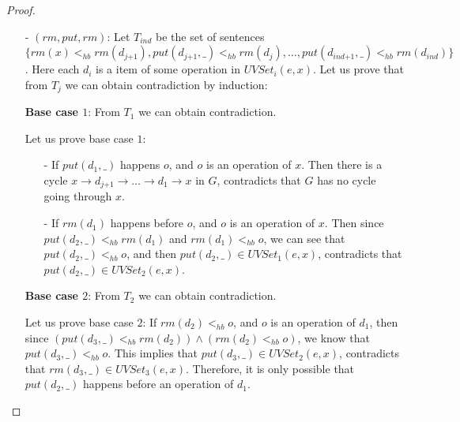 \begin {proof}
\begin{itemize}
\begin{itemize}
    \item[-] If $( j > 1 ) \wedge ( \textit{rm}(d_j) <_{hb} o'' )$, where $o''$ is an operation of item $d_{\textit{j-1}}$ and $\textit{put}(d_{\textit{j-1}},\_), \textit{rm}(d_{\textit{j-1}}) \in \textit{UVSet}_{\textit{j-1}}(e,x)$: Then since $( \textit{put}(d_{\textit{j+1}},\_) <_{hb} \textit{put}(d_j,\_) ) \wedge ( \textit{rm}(d_j) <_{hb} o'' )$, we can see that $( \textit{put}(d_{\textit{j+1}},\_) <_{hb} o'' ) \vee ( \textit{rm}(d_j) <_{hb} \textit{put}(d_j,\_) )$, which is impossible.

    \item[-] If $( j > 1 ) \wedge ( \textit{rm}(d_j) <_{hb} o'' )$, where $o''$ is an operation of $x$: Similar to above case.
    \end{itemize}

\item[-] $(\textit{rm},\textit{put},\textit{rm})$: Let $T_{\textit{ind}}$ be the set of sentences $\{ \textit{rm}(x) <_{hb} \textit{rm}(d_{\textit{j+1}}), \textit{put}(d_{\textit{j+1}},\_) <_{hb} \textit{rm}(d_j),\ldots, \textit{put}(d_{\textit{ind+1}},\_) <_{hb} \textit{rm}(d_{\textit{ind}}) \}$. Here each $d_i$ is a item of some operation in $\textit{UVSet}_i(e,x)$. Let us prove that from $T_j$ we can obtain contradiction by induction:

    {\bf Base case $1$}: From $T_1$ we can obtain contradiction.

    Let us prove base case $1$:

    \begin{itemize}
    \setlength{\itemsep}{0.5pt}
    \item[-] If $\textit{put}(d_1,\_)$ happens $o$, and $o$ is an operation of $x$. Then there is a cycle $x \rightarrow d_{\textit{j+1}} \rightarrow \ldots \rightarrow d_1 \rightarrow x$ in $G$, contradicts that $G$ has no cycle going through $x$.

    \item[-] If $\textit{rm}(d_1)$ happens before $o$, and $o$ is an operation of $x$. Then since $\textit{put}(d_2,\_) <_{hb} \textit{rm}(d_1)$ and $\textit{rm}(d_1) <_{hb} o$, we can see that $\textit{put}(d_2,\_) <_{hb} o$, and then $\textit{put}(d_2,\_) \in \textit{UVSet}_1(e,x)$, contradicts that $\textit{put}(d_2,\_) \in \textit{UVSet}_2(e,x)$.
    \end{itemize}

    {\bf Base case $2$}: From $T_2$ we can obtain contradiction.

    Let us prove base case $2$: If $\textit{rm}(d_2) <_{hb} o$, and $o$ is an operation of $d_1$, then since $( \textit{put}(d_3,\_) <_{hb} \textit{rm}(d_2) ) \wedge ( \textit{rm}(d_2) <_{hb} o )$, we know that $\textit{put}(d_3,\_) <_{hb} o$. This implies that $\textit{put}(d_3,\_) \in \textit{UVSet}_2(e,x)$, contradicts that $\textit{rm}(d_3,\_) \in \textit{UVSet}_3(e,x)$. Therefore, it is only possible that $\textit{put}(d_2,\_)$ happens before an operation of $d_1$.


\end{itemize}
\end{proof}
